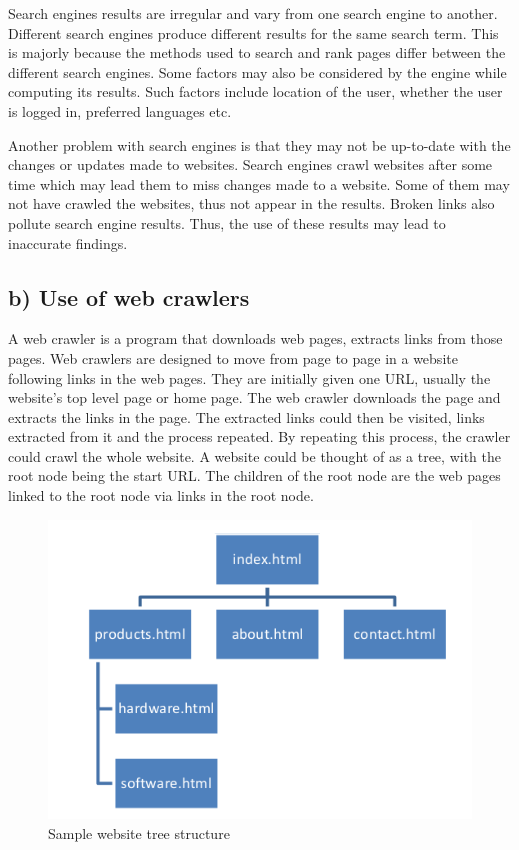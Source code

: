\noindent
Search engines results are irregular and vary from one search engine to another. Different search engines produce different results for the same search term. This is majorly because the methods used to search and rank pages differ between the different search engines. Some factors may also be considered by the engine while computing its results. Such factors include location of the user, whether the user is logged in, preferred languages etc.

\noindent
Another problem with search engines is that they may not be up-to-date with the changes or updates made to websites. Search engines crawl websites after some time which may lead them to miss changes made to a website. Some of them may not have crawled the websites, thus not appear in the results. Broken links also pollute search engine results. Thus, the use of these results may lead to inaccurate findings.

\subsection{b) Use of web crawlers}
\noindent
A web crawler is a program that downloads web pages, extracts links from those pages. Web crawlers are designed to move from page to page in a website following links in the web pages. They are initially given one URL, usually the website’s top level page or home page. The web crawler downloads the page and extracts the links in the page. The extracted links could then be visited, links extracted from it and the process repeated. By repeating this process, the crawler could crawl the whole website.
A website could be thought of as a tree, with the root node being the start URL. The children of the root node are the web pages linked to the root node via links in the root node.

\begin{figure}[H]
	\includegraphics[width=\linewidth,scale=0.5]{../static/img/webtree.png}
	\caption{Sample website tree structure}
\end{figure}


